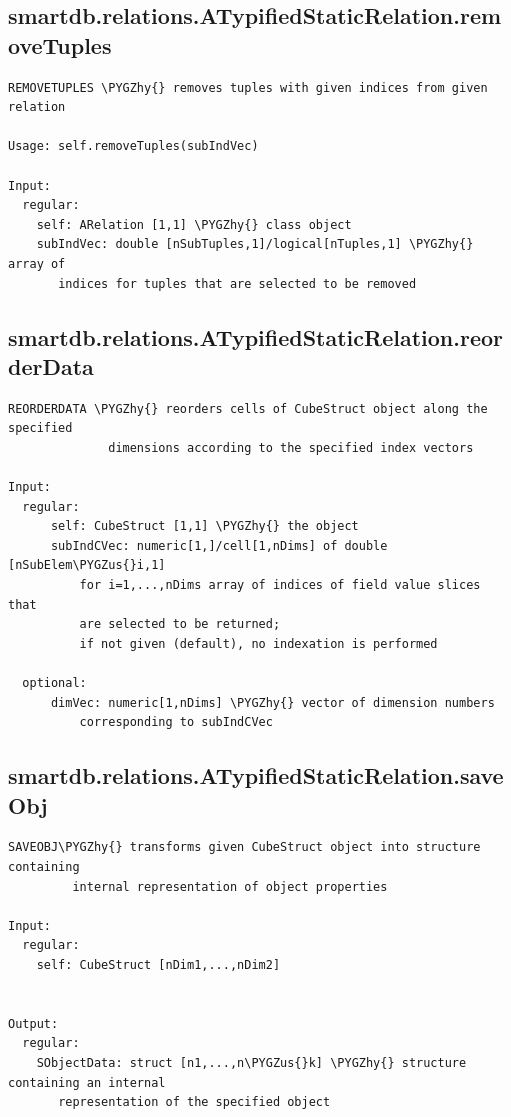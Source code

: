 \documentclass[letterpaper,10pt,english]{sphinxmanual}
\def\PYGZus{\char`\_}
\def\PYGZhy{\char`\-}
\begin{document}
\subsection{smartdb.relations.ATypifiedStaticRelation.removeTuples}
\label{chap_functions:smartdb-relations-atypifiedstaticrelation-removetuples}
\begin{Verbatim}[commandchars=\\\{\}]
REMOVETUPLES \PYGZhy{} removes tuples with given indices from given relation

Usage: self.removeTuples(subIndVec)

Input:
  regular:
    self: ARelation [1,1] \PYGZhy{} class object
    subIndVec: double [nSubTuples,1]/logical[nTuples,1] \PYGZhy{} array of
       indices for tuples that are selected to be removed
\end{Verbatim}


\subsection{smartdb.relations.ATypifiedStaticRelation.reorderData}
\label{chap_functions:smartdb-relations-atypifiedstaticrelation-reorderdata}
\begin{Verbatim}[commandchars=\\\{\}]
REORDERDATA \PYGZhy{} reorders cells of CubeStruct object along the specified
              dimensions according to the specified index vectors

Input:
  regular:
      self: CubeStruct [1,1] \PYGZhy{} the object
      subIndCVec: numeric[1,]/cell[1,nDims] of double [nSubElem\PYGZus{}i,1]
          for i=1,...,nDims array of indices of field value slices that
          are selected to be returned;
          if not given (default), no indexation is performed

  optional:
      dimVec: numeric[1,nDims] \PYGZhy{} vector of dimension numbers
          corresponding to subIndCVec
\end{Verbatim}


\subsection{smartdb.relations.ATypifiedStaticRelation.saveObj}
\label{chap_functions:smartdb-relations-atypifiedstaticrelation-saveobj}
\begin{Verbatim}[commandchars=\\\{\}]
SAVEOBJ\PYGZhy{} transforms given CubeStruct object into structure containing
         internal representation of object properties

Input:
  regular:
    self: CubeStruct [nDim1,...,nDim2]


Output:
  regular:
    SObjectData: struct [n1,...,n\PYGZus{}k] \PYGZhy{} structure containing an internal
       representation of the specified object
\end{Verbatim}
\end{document}
